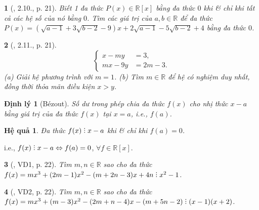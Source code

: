\documentclass{article}
\newtheorem{baitoan}{}
\newtheorem{dinhly}{Định lý}
\newtheorem{hequa}{Hệ quả}
\DeclareRobustCommand{\divby}{%
	\mathrel{\vbox{\baselineskip.65ex\lineskiplimit0pt\hbox{.}\hbox{.}\hbox{.}}}%
}
\begin{document}
\begin{baitoan}[\cite{Binh_boi_duong_Toan_9_tap_2}, 2.10., p. 21]
	Biết 1 đa thức $P(x)\in\mathbb{R}[x]$ bằng đa thức $0$ khi \& chỉ khi tất cả các hệ số của nó bằng $0$. Tìm các giá trị của $a,b\in\mathbb{R}$ để đa thức $P(x) = (\sqrt{a - 1} + 3\sqrt{b - 2} - 9)x + 2\sqrt{a - 1} - 5\sqrt{b - 2} + 4$ bằng đa thức $0$.
\end{baitoan}

\begin{baitoan}[\cite{Binh_boi_duong_Toan_9_tap_2}, 2.11., p. 21]
	\begin{equation*}
		\left\{\begin{split}
			x - my &= 3,\\
			mx - 9y &= 2m - 3.
		\end{split}\right.
	\end{equation*}
	(a) Giải hệ phương trình với $m = 1$. (b) Tìm $m\in\mathbb{R}$ để hệ có nghiệm duy nhất, đồng thời thỏa mãn điều kiện $x > y$.
\end{baitoan}

\begin{dinhly}[B\'ezout]
	Số dư trong phép chia đa thức $f(x)$ cho nhị thức $x - a$ bằng giá trị của đa thức $f(x)$ tại $x = a$, i.e., $f(a)$.
\end{dinhly}

\begin{hequa}
	Đa thức $f(x)\divby x - a$ khi \& chỉ khi $f(a) = 0$.
\end{hequa}
i.e., $f(x)\divby x - a\Leftrightarrow f(a) = 0$, $\forall f\in\mathbb{R}[x]$.

\begin{baitoan}[\cite{Binh_boi_duong_Toan_9_tap_2}, VD1, p. 22]
	Tìm $m,n\in\mathbb{R}$ sao cho đa thức $f(x) = mx^3 + (2m - 1)x^2 - (m + 2n - 3)x + 4n\divby x^2 - 1$.
\end{baitoan}

\begin{baitoan}[\cite{Binh_boi_duong_Toan_9_tap_2}, VD2, p. 22]
	Tìm $m,n\in\mathbb{R}$ sao cho đa thức $f(x) = mx^3 + (m - 3)x^2 - (2m + n - 4)x - (m + 5n - 2)\divby(x - 1)(x + 2)$.
\end{baitoan}
\end{document}
